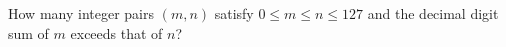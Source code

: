 How many integer pairs $(m,n)$ satisfy $0\le m\le n\le127$ and the decimal digit sum of $m$ exceeds that of $n$?
